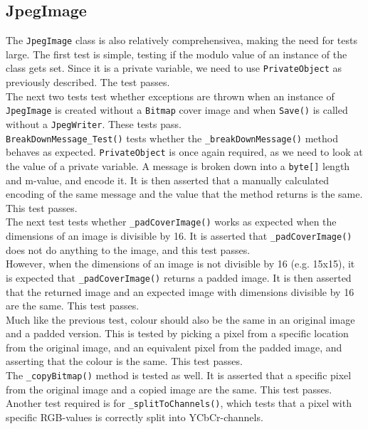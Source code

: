 \subsection{JpegImage}
The \lstinline|JpegImage| class is also relatively comprehensivea, making the need for tests large.
The first test is simple, testing if the modulo value of an instance of the class gets set.
Since it is a private variable, we need to use \lstinline|PrivateObject| as previously described.
The test passes.\\
The next two tests test whether exceptions are thrown when an instance of \lstinline|JpegImage| is created without a \lstinline|Bitmap| cover image and when \lstinline|Save()| is called without a \lstinline|JpegWriter|.
These tests pass.\\
\lstinline|BreakDownMessage_Test()| tests whether the \lstinline|_breakDownMessage()| method behaves as expected.
\lstinline|PrivateObject| is once again required, as we need to look at the value of a private variable.
A message is broken down into a \lstinline|byte[]| length and m-value, and encode it.
It is then asserted that a manually calculated encoding of the same message and the value that the method returns is the same.
This test passes.\\
The next test tests whether \lstinline|_padCoverImage()| works as expected when the dimensions of an image is divisible by 16.
It is asserted that \lstinline|_padCoverImage()| does not do anything to the image, and this test passes.\\
However, when the dimensions of an image is not divisible by 16 (e.g. 15x15), it is expected that \lstinline|_padCoverImage()| returns a padded image.
It is then asserted that the returned image and an expected image with dimensions divisible by 16 are the same.
This test passes.\\
Much like the previous test, colour should also be the same in an original image and a padded version. This is tested by picking a pixel from a specific location from the original image, and an equivalent pixel from the padded image, and asserting that the colour is the same.
This test passes.\\
The \lstinline|_copyBitmap()| method is tested as well.
It is asserted that a specific pixel from the original image and a copied image are the same.
This test passes.\\
Another test required is for \lstinline|_splitToChannels()|, which tests that a pixel with specific RGB-values is correctly split into YCbCr-channels.
